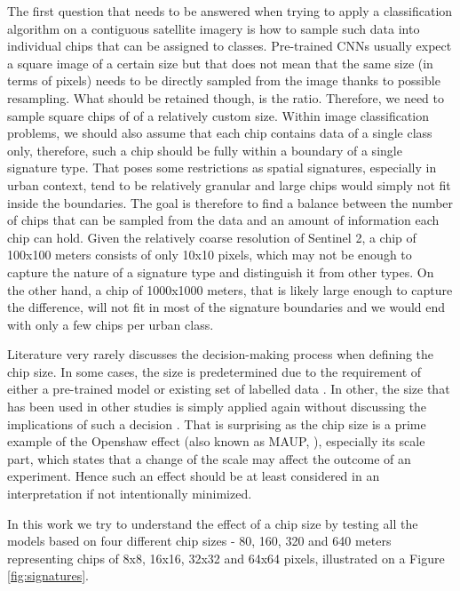 The first question that needs to be answered when trying to apply a classification
algorithm on a contiguous satellite imagery is how to sample such data into individual
chips that can be assigned to classes. Pre-trained CNNs usually expect a square image of
a certain size but that does not mean that the same size (in terms of pixels) needs to
be directly sampled from the image thanks to possible resampling. What should be
retained though, is the ratio. Therefore, we need to sample square chips of of a
relatively custom size. Within image classification problems, we should also assume that
each chip contains data of a single class only, therefore, such a chip should be fully
within a boundary of a single signature type. That poses some restrictions as spatial
signatures, especially in urban context, tend to be relatively granular and large chips
would simply not fit inside the boundaries. The goal is therefore to find a balance
between the number of chips that can be sampled from the data and an amount of
information each chip can hold. Given the relatively coarse resolution of Sentinel 2, a
chip of 100x100 meters consists of only 10x10 pixels, which may not be enough to capture
the nature of a signature type and distinguish it from other types. On the other hand, a
chip of 1000x1000 meters, that is likely large enough to capture the difference, will
not fit in most of the signature boundaries and we would end with only a few chips per
urban class.

Literature very rarely discusses the decision-making process when defining the chip
size. In some cases, the size is predetermined due to the requirement of either a
pre-trained model or existing set of labelled data \citep{taubenbock2020}. In other, the size that has
been used in other studies is simply applied again without discussing the implications
of such a decision \citep{wang2018mapping}. That is surprising as the chip size is a prime example of the
Openshaw effect (also known as MAUP, \citep{openshaw1981modifiable}), especially its scale part, which states that
a change of the scale may affect the outcome of an experiment. Hence such an effect
should be at least considered in an interpretation if not intentionally minimized.

In this work we try to understand the effect of a chip size by testing all the models
based on four different chip sizes - 80, 160, 320 and 640 meters representing chips of
8x8, 16x16, 32x32 and 64x64 pixels, illustrated on a Figure \ref{fig:signatures}.



